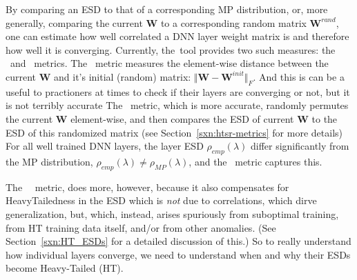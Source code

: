 By comparing an ESD to that of a corresponding MP distribution,
or, more generally, comparing the current $\mathbf{W}$ to a
corresponding random matrix $\mathbf{W}^{rand}$,
one can estimate how well correlated a DNN layer weight matrix is
and therefore how well it is converging.
Currently, the~\WW tool provides two such measures: the \INITDIST~and \RANDDIST~metrics.
The \INITDIST~metric measures the element-wise distance between the current $\mathbf{W}$ and it's
initial (random) matrix: $\Vert\mathbf{W}-\mathbf{W}^{init}\Vert_{F}$.
And this is can be a  useful to practioners at times to check if their layers are converging or not,
but it is not terribly accurate\cite{MM21a_simpsons_TR,Yao}
The \RANDDIST~metric, which is more accurate, randomly permutes the current $\mathbf{W}$ element-wise,
and then compares the ESD of current $\mathbf{W}$ to the ESD of this randomized matrix
(see Section~\ref{sxn:htsr-metrics} for more details)
For all well trained DNN layers, the layer ESD $\rho_{emp}(\lambda)$
differ significantly from the MP distribution, $\rho_{emp}(\lambda)\ne\rho_{MP}(\lambda)$,
and the \RANDDIST~metric captures this.




The \WW~\RANDDIST~metric, does more, however,  because it also
compensates for HeavyTailedness in the ESD which is \emph{not} due to correlations,
which dirve generalization,  but, which,  instead, arises spuriously from
suboptimal training, from HT training data itself, and/or from other anomalies.
(See Section~\ref{sxn:HT_ESDs} for a detailed discussion of this.)
So to really understand how individual layers converge, we need to
understand when and why their ESDs become Heavy-Tailed (HT).
